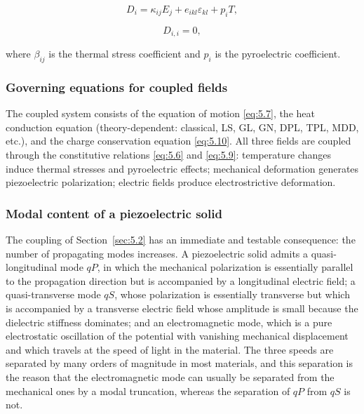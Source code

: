 \begin{equation}
D_i = \kappa_{ij}E_j + e_{ikl}\varepsilon_{kl} + p_i T,
\label{eq:5.9}
\end{equation}

\begin{equation}
D_{i,i} = 0,
\label{eq:5.10}
\end{equation}

where $\beta_{ij}$ is the thermal stress coefficient and $p_i$ is the pyroelectric coefficient.

\subsubsection{Governing equations for coupled fields}

The coupled system consists of the equation of motion \eqref{eq:5.7}, the heat conduction equation (theory-dependent: classical, LS, GL, GN, DPL, TPL, MDD, etc.), and the charge conservation equation \eqref{eq:5.10}. All three fields are coupled through the constitutive relations \eqref{eq:5.6} and \eqref{eq:5.9}: temperature changes induce thermal stresses and pyroelectric effects; mechanical deformation generates piezoelectric polarization; electric fields produce electrostrictive deformation.

\subsubsection{Modal content of a piezoelectric solid}

The coupling of Section~\ref{sec:5.2} has an immediate and testable consequence: the number of propagating modes increases. A piezoelectric solid admits a quasi-longitudinal mode $qP$, in which the mechanical polarization is essentially parallel to the propagation direction but is accompanied by a longitudinal electric field; a quasi-transverse mode $qS$, whose polarization is essentially transverse but which is accompanied by a transverse electric field whose amplitude is small because the dielectric stiffness dominates; and an electromagnetic mode, which is a pure electrostatic oscillation of the potential with vanishing mechanical displacement and which travels at the speed of light in the material. The three speeds are separated by many orders of magnitude in most materials, and this separation is the reason that the electromagnetic mode can usually be separated from the mechanical ones by a modal truncation, whereas the separation of $qP$ from $qS$ is not.

